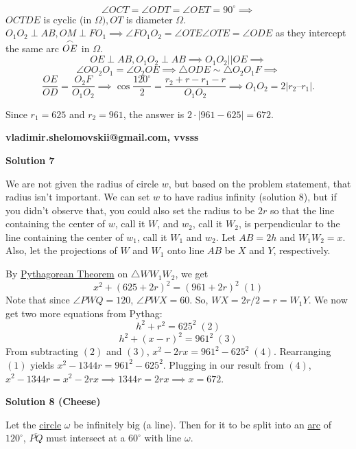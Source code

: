 \begin{enumerate}
 
 \[\angle OCT = \angle ODT = \angle OET = 90^\circ \implies\]
$OCTDE$ is cyclic (in $\Omega), OT$ is diameter $\Omega.$ $O_1O_2 \perp AB, OM \perp FO_1 \implies \angle FO_1O_2 = \angle OTE$$\angle OTE = \angle ODE$ as they intercept the same arc  $\overset{\Large\frown}{OE}$ in $\Omega.$
 \[OE \perp AB, O_1O_2 \perp AB \implies O_1 O_2 || OE \implies\]
 \[\angle OO_2O_1 = \angle O_2 OE \implies \triangle ODE \sim \triangle O_2 O_1 F \implies\]
 \[\frac {OE}{OD} = \frac {O_2F}{O_1O_2} \implies \cos \frac {120^\circ}{2} = \frac{r_2 + r - r_1 -r} {O_1O_2}\implies {O_1O_2}= 2|r_2 – r_1|.\]

 Since $r_{1}=625$ and $r_{2}=961$, the answer is $2\cdot|961-625|=\boxed{672}$.

 \textbf{vladimir.shelomovskii@gmail.com, vvsss}

 



\textbf{Solution 7}

We are not given the radius of circle $w$, but based on the problem statement, that radius isn't important. We can set $w$ to have radius infinity (solution 8), but if you didn't observe that, you could also set the radius to be $2r$ so that the line containing the center of $w$, call it $W$, and $w_2$, call it $W_2$, is perpendicular to the line containing the center of $w_1$, call it $W_1$ and $w_2$. Let $AB = 2h$ and $W_1W_2 = x$. Also, let the projections of $W$ and $W_1$ onto line $AB$ be $X$ and $Y$, respectively.

 By \href{https://artofproblemsolving.com/wiki/index.php?title=Pythagorean\_Theorem}{Pythagorean Theorem} on $\triangle WW_1W_2$, we get
 \[x^2+(625+2r)^2=(961+2r)^2 \;(1)\]Note that since $\angle PWQ = 120$, $\angle PWX = 60$. So, $WX = 2r/2 = r = W_1Y$. We now get two more equations from Pythag:
 \[h^2+r^2 = 625^2 \; (2)\]
 \[h^2+(x-r)^2 = 961^2 \; (3)\]From subtracting $(2)$ and $(3)$, $x^2-2rx=961^2-625^2 \; (4)$. Rearranging $(1)$ yields $x^2-1344r = 961^2-625^2$. Plugging in our result from $(4)$, $x^2-1344r= x^2-2rx \implies 1344r = 2rx \implies x=\boxed{672}$.

 



\textbf{Solution 8 (Cheese)}

Let the \href{https://artofproblemsolving.com/wiki/index.php?title=Circle}{circle} $\omega$ be infinitely big (a line). Then for it to be split into an \href{https://artofproblemsolving.com/wiki/index.php?title=Arc}{arc} of $120^{\circ}$, $\overline{PQ}$ must intersect at a $60^{\circ}$ with line $\omega$.


\end{enumerate}
